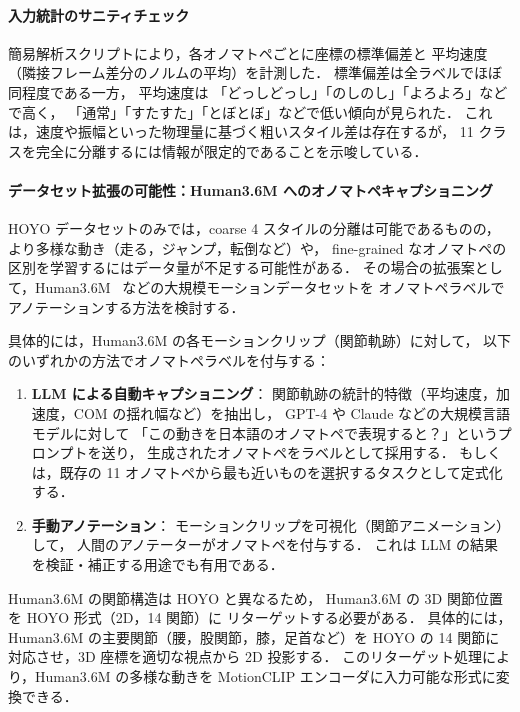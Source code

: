 \documentclass[a4paper,10pt]{jsarticle}
\begin{document}
\paragraph{入力統計のサニティチェック}
簡易解析スクリプトにより，各オノマトペごとに座標の標準偏差と
平均速度%
（隣接フレーム差分のノルムの平均）を計測した．
標準偏差は全ラベルでほぼ同程度である一方，
平均速度は
「どっしどっし」「のしのし」「よろよろ」などで高く，
「通常」「すたすた」「とぼとぼ」などで低い傾向が見られた．
これは，速度や振幅といった物理量に基づく粗いスタイル差は存在するが，
11 クラスを完全に分離するには情報が限定的であることを示唆している．

\paragraph{データセット拡張の可能性：Human3.6M へのオノマトペキャプショニング}
HOYO データセットのみでは，coarse 4 スタイルの分離は可能であるものの，
より多様な動き（走る，ジャンプ，転倒など）や，
fine-grained なオノマトペの区別を学習するにはデータ量が不足する可能性がある．
その場合の拡張案として，Human3.6M~\cite{human36m} などの大規模モーションデータセットを
オノマトペラベルでアノテーションする方法を検討する．

具体的には，Human3.6M の各モーションクリップ（関節軌跡）に対して，
以下のいずれかの方法でオノマトペラベルを付与する：
\begin{enumerate}
  \item \textbf{LLM による自動キャプショニング}：
    関節軌跡の統計的特徴（平均速度，加速度，COM の揺れ幅など）を抽出し，
    GPT-4 や Claude などの大規模言語モデルに対して
    「この動きを日本語のオノマトペで表現すると？」というプロンプトを送り，
    生成されたオノマトペをラベルとして採用する．
    もしくは，既存の 11 オノマトペから最も近いものを選択するタスクとして定式化する．
  \item \textbf{手動アノテーション}：
    モーションクリップを可視化（関節アニメーション）して，
    人間のアノテーターがオノマトペを付与する．
    これは LLM の結果を検証・補正する用途でも有用である．
\end{enumerate}

Human3.6M の関節構造は HOYO と異なるため，
Human3.6M の 3D 関節位置を HOYO 形式（2D，14 関節）に
リターゲットする必要がある．
具体的には，Human3.6M の主要関節（腰，股関節，膝，足首など）を
HOYO の 14 関節に対応させ，3D 座標を適切な視点から 2D 投影する．
このリターゲット処理により，Human3.6M の多様な動きを
MotionCLIP エンコーダに入力可能な形式に変換できる．
\end{document}
